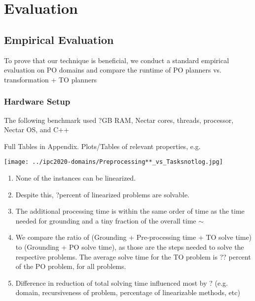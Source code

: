 \chapter{Evaluation}\label{chap:evaluation}


\section{Empirical Evaluation}
To prove that our technique is beneficial, we conduct a standard empirical evaluation on PO domains and compare the runtime of PO planners vs. transformation + TO planners





\subsection{Hardware Setup}
The following benchmark used ?GB RAM, %
Nectar cores, threads, processor, %
Nectar OS, and %
C++


Full Tables in Appendix. Plots/Tables of relevant properties, e.g.
\begin{center}
	\texttt{[image: ../ipc2020-domains/Preprocessing**\_vs\_Tasksnotlog.jpg]}
\end{center}

\begin{enumerate}
	\item None of the instances can be linearized.
	\item Despite this, ?percent of linearized problems are solvable.
	\item The additional processing time is within the same order of time as the time needed for grounding and a tiny fraction of the overall time $\sim$
	\item We compare the ratio of (Grounding + Pre-processing time + TO solve time) to (Grounding + PO solve time), as those
	are the steps needed to solve the respective problems. The average solve time for the TO problem is ?? percent of the PO problem, for all problems.
	\item Difference in reduction of total solving time influenced most by ? (e.g. domain, recursiveness of problem, percentage of linearizable methods, etc)
\end{enumerate}